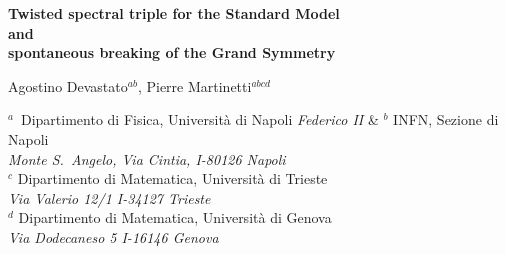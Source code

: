 \documentclass[11pt]{article}
\begin{document}
\baselineskip=14pt
\begin{flushright}
\end{flushright}
\begin{center}
{\Large{\bf Twisted spectral triple for the Standard Model\\[2pt] and\\[4pt]
spontaneous breaking of the Grand Symmetry}}
\bigskip

{\large{Agostino Devastato$^{ ab}$,\; Pierre Martinetti$^{ abcd}$}}
\bigskip

$^a$\,  Dipartimento di Fisica, Universit\`{a} di Napoli {\sl Federico
  II} \;\&\; $^b${ INFN, Sezione di Napoli}\\
{\it Monte S.~Angelo, Via Cintia, I-80126 Napoli}\\[5pt]
$^c$ Dipartimento di Matematica,  Universit\`{a} di Trieste\\
{\it Via Valerio
12/1 I-34127 Trieste}\\
$^d$ Dipartimento di Matematica,  Universit\`{a} di Genova\\
{\it Via Dodecaneso 5 I-16146 Genova}
\end{center}

\begin{abstract}
Grand symmetry models in noncommutative geometry, characterized by a
non-trivial action of functions on spinors, have been introduced 
to generate minimally (i.e. without adding new fermions)
and in agreement with the first order condition an
extra scalar field beyond the standard model, which both stabilizes the electroweak vacuum and
makes the computation of the mass of the Higgs
compatible with its experimental value. In this
paper, we use a twist in the sense of Connes-Moscovici to  cure
a technical problem due to the non-trivial action on spinors, that is the appearance
 together with the extra scalar field  of unbounded vectorial terms. The
twist makes these terms bounded and - thanks to a twisted version
of the first-order condition that we introduce here - also permits to
understand the breaking to the standard model as a dynamical process
induced by the spectral action, as conjectured in
\cite{Devastato:2013fk}. This is a spontaneous breaking from a pre-geometric Pati-Salam model to the almost-commutative
geometry of the standard model, with two Higgs-like fields: scalar and vector.
\end{abstract}

\end{document}
